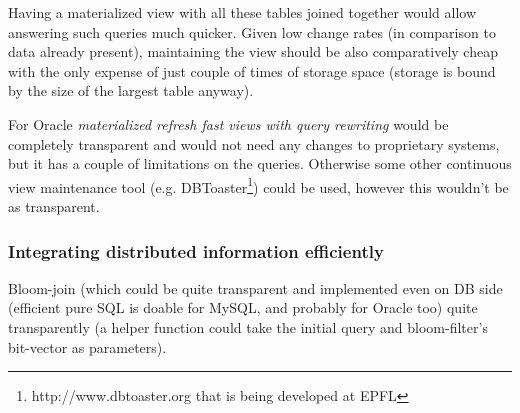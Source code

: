 Having a materialized view with all these tables joined together would allow answering such queries much quicker. Given low change rates (in comparison to data already present), maintaining the view should be also comparatively cheap with the only expense of just couple of times of storage space (storage is bound by the size of the largest table anyway).

For Oracle \textit{materialized refresh fast views with query rewriting} would be completely transparent and would not need any changes to proprietary systems, but it has a couple of limitations on the queries\cite{Oracle11}. Otherwise some other continuous view maintenance tool (e.g. DBToaster\footnote{http://www.dbtoaster.org that is being developed at EPFL}) could be used, however this wouldn't be as transparent.


\subsubsection*{Integrating distributed information efficiently}
Bloom-join (which could be quite transparent and implemented even on DB side (efficient pure SQL is doable for MySQL, and probably for Oracle too) quite transparently (a helper function could take the initial query and bloom-filter's bit-vector as parameters). 